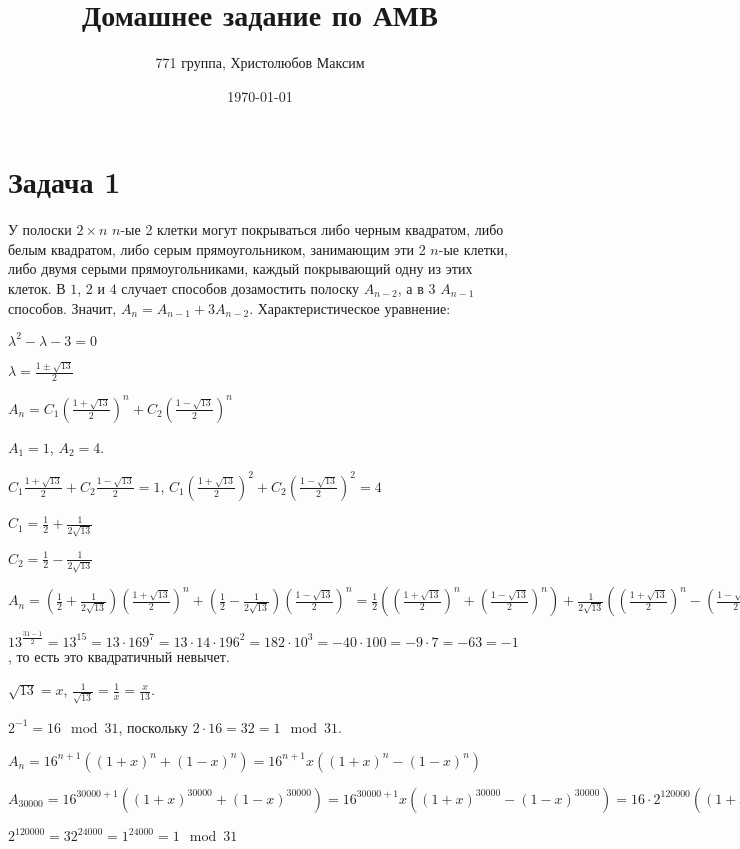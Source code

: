 \documentclass[a4paper,12pt]{article} %
\author{771 группа, Христолюбов Максим}
\title{Домашнее задание по АМВ}
\date{\today}
\begin{document}
	
	\maketitle

\section{Задача 1}
\hspace{5mm}
У полоски $2\times n$ $n$-ые 2 клетки могут покрываться либо черным квадратом, либо белым квадратом, либо серым прямоугольником, занимающим эти 2 $n$-ые клетки, либо двумя серыми прямоугольниками, каждый покрывающий одну из этих клеток. В $1$, $2$ и $4$ случает способов дозамостить полоску $A_{n-2}$, а в $3$ $A_{n-1}$ способов. Значит, $A_n=A_{n-1}+3A_{n-2}$. Характеристическое уравнение:

$\lambda^2-\lambda-3=0$

$\lambda=\frac{1\pm\sqrt{13}}{2}$

$A_n=C_1(\frac{1+\sqrt{13}}{2})^n+C_2(\frac{1-\sqrt{13}}{2})^n$

$A_1=1$, $A_2=4$.

$C_1\frac{1+\sqrt{13}}{2}+C_2\frac{1-\sqrt{13}}{2}=1$, $C_1(\frac{1+\sqrt{13}}{2})^2+C_2(\frac{1-\sqrt{13}}{2})^2=4$

$C_1=\frac{1}{2}+\frac{1}{2\sqrt{13}}$

$C_2=\frac{1}{2}-\frac{1}{2\sqrt{13}}$

$A_n=(\frac{1}{2}+\frac{1}{2\sqrt{13}})(\frac{1+\sqrt{13}}{2})^n+(\frac{1}{2}-\frac{1}{2\sqrt{13}})(\frac{1-\sqrt{13}}{2})^n=\frac{1}{2}((\frac{1+\sqrt{13}}{2})^n+(\frac{1-\sqrt{13}}{2})^n)+\frac{1}{2\sqrt{13}}((\frac{1+\sqrt{13}}{2})^n-(\frac{1-\sqrt{13}}{2})^n)$

$13^{\frac{31-1}{2}}=13^{15}=13\cdot 169^7=13\cdot 14\cdot 196^2=182\cdot 10^3=-40\cdot 100=-9\cdot 7 = -63 = -1$, то есть это квадратичный невычет.

$\sqrt{13}=x$, $\frac{1}{\sqrt{13}}=\frac{1}{x}=\frac{x}{13}$.

$2^{-1}=16\mod 31$, поскольку $2\cdot 16=32=1\mod 31$.

$A_n=16^{n+1}((1+x)^n+(1-x)^n)=16^{n+1}x((1+x)^n-(1-x)^n)$

$A_{30000}=16^{{30000}+1}((1+x)^{30000}+(1-x)^{30000})=16^{{30000}+1}x((1+x)^{30000}-(1-x)^{30000})=16\cdot 2^{120000}((1+x)^{30000}+(1-x)^{30000})+x((1+x)^{30000}-(1-x)^{30000})$

$2^{120000}=32^{24000}=1^{24000}=1\mod 31$
\end{document}
